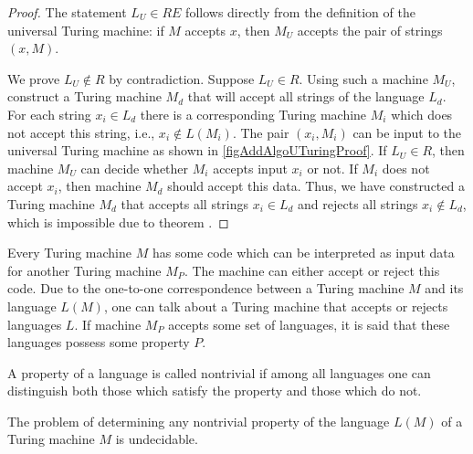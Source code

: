 \begin{proof}
The statement $L_U \in RE$ follows directly from the definition of the universal
Turing machine: if $M$ accepts $x$, then $M_U$ accepts the pair of
strings $\left(x, M\right)$.

We prove $L_U \notin R$ by contradiction. Suppose $L_U \in R$. Using such a machine $M_U$, construct a Turing machine $M_d$ that will accept all strings of the language $L_d$. For each string
$x_i \in L_d$ there is a corresponding Turing machine $M_i$ which does not accept this string, i.e., $x_i \notin L\left(M_i\right)$. The pair $\left(x_i, M_i\right)$ can be input to the universal Turing machine as shown in 
\autoref{figAddAlgoUTuringProof}. If $L_U \in R$, then machine $M_U$ can decide whether $M_i$ accepts input $x_i$ or not. If $M_i$ does not accept $x_i$, then machine $M_d$ should accept this data. Thus, we have constructed a Turing machine $M_d$ that accepts all strings $x_i \in L_d$ and rejects all strings $x_i \notin L_d$, which is impossible due to theorem .
\end{proof}

Every Turing machine $M$ has some code which can be interpreted as input data for another Turing machine $M_P$. The machine can either accept or reject this code. Due to the one-to-one correspondence between a Turing machine $M$ and its language $L\left(M\right)$, one can talk about a Turing machine that accepts or rejects languages $L$. If machine $M_P$ accepts some set of languages, it is said that these languages possess some property $P$.

\begin{definition}
A property of a language is called nontrivial if among all languages one can distinguish both those which satisfy the property and those which do not.
\end{definition}

\begin{theorem}
The problem of determining any nontrivial property of the language 
$L\left(M\right)$ of a Turing machine $M$ is undecidable.
\end{theorem}

